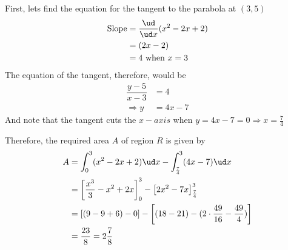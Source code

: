 \begin{solution}[\fullpage]
   First, lets find the equation for the tangent to the parabola at $(3,5)$
   \begin{align}
      \text{Slope} &= \dfrac{\ud}{\ud x}(x^2-2x+2) \\
                   &= (2x-2) \\
                   &= 4 \text{ when } x = 3
   \end{align}
   The equation of the tangent, therefore, would be 
   \begin{align}
       \dfrac{y-5}{x-3} &= 4 \\
       \Rightarrow y &= 4x - 7
   \end{align}
   And note that the tangent cuts the $x-axis$ when $y = 4x - 7 = 0 \Rightarrow x = \frac{7}{4}$
   
   Therefore, the required area $A$ of region $R$ is given by
   \begin{align}
      A &= \int_0^3 (x^2-2x+2)\ud x - \int_{\frac{7}{4}}^3 (4x - 7) \ud x \\
        &= \left[ \dfrac{x^3}{3}-x^2+2x\right]_0^3 - \left[ 2x^2-7x \right]_{\frac{7}{4}}^3 \\
        &= \left[(9-9+6)-0 \right] - \left[(18-21)-(2\cdot\frac{49}{16}-\frac{49}{4}) \right] \\
        &= \frac{23}{8} = 2\frac{7}{8}
   \end{align}
\end{solution}
